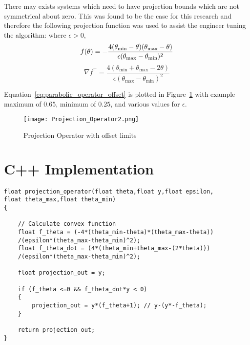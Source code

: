 There may exists systems which need to have projection bounds which are not symmetrical about zero.  This was found to be the case for this research and therefore the following projection function was used to assist the engineer tuning the algorithm:\newline
\newline
where $\epsilon>0$,
\begin{equation}\label{eq:parabolic_operator_offset}
	f(\theta)=-\frac{4(\theta_{\text{min}}-\theta)(\theta_{\text{max}}-\theta)}{\epsilon(\theta_{\text{max}}-\theta_{\text{min}})^2}\\
\end{equation}
\begin{equation}
	\nabla f^\top=\frac{4(\theta_{\text{min}}+\theta_{\text{max}}-2\theta)}{\epsilon(\theta_{\text{max}}-\theta_{\text{min}})^2}
\end{equation}


Equation~\ref{eq:parabolic_operator_offset} is plotted in Figure~\ref{fig:projection_operator_offset} with example maximum of $0.65$, minimum of $0.25$,  and various values for $\epsilon$. 
\begin{figure}[h!]
 \centering
  \texttt{[image: Projection\_Operator2.png]}
  \caption{Projection Operator with offset limits}
  \label{fig:projection_operator_offset}
\end{figure}

\section{C++ Implementation}


\begin{lstlisting}
float projection_operator(float theta,float y,float epsilon,
float theta_max,float theta_min)
{
	
	// Calculate convex function
	float f_theta = (-4*(theta_min-theta)*(theta_max-theta))
	/(epsilon*(theta_max-theta_min)^2);
	float f_theta_dot = (4*(theta_min+theta_max-(2*theta)))
	/(epsilon*(theta_max-theta_min)^2);	

	float projection_out = y;

	if (f_theta <=0 && f_theta_dot*y < 0)
	{
		projection_out = y*(f_theta+1); // y-(y*-f_theta);
	}	
 
   	return projection_out;
}
\end{lstlisting}